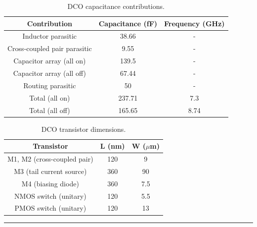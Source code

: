 \begin{table}[H]
    \centering
    \caption{DCO capacitance contributions.}
    \begin{tabular}{|c|c|c|}
        \hline
        Contribution & Capacitance (fF) & Frequency (GHz) \\
        \hline
        Inductor parasitic & 38.66 & - \\
        Cross-coupled pair parasitic & 9.55 & - \\
        Capacitor array (all on) & 139.5 & - \\
        Capacitor array (all off) & 67.44 & - \\
        Routing parasitic & 50 & - \\
        \hline
        Total (all on) & 237.71 & 7.3 \\
        Total (all off) & 165.65 & 8.74 \\
        \hline
    \end{tabular}
    \label{tab:DCO_capacitance_contribution}
\end{table}

\begin{table}[H]
    \centering
    \caption{DCO transistor dimensions.}
    \begin{tabular}{|c|c|c|}
        \hline
        Transistor & L (nm) & W ($\mu$m) \\
        \hline
        M1, M2 (cross-coupled pair) & 120 & 9 \\
        M3 (tail current source) & 360 & 90 \\
        M4 (biasing diode) & 360 & 7.5 \\
        NMOS switch (unitary) & 120 & 5.5 \\
        PMOS switch (unitary) & 120 & 13 \\
        \hline
    \end{tabular}
    \label{tab:DCO_dimensions}
\end{table}


\noindent\rule{\textwidth}{1pt}